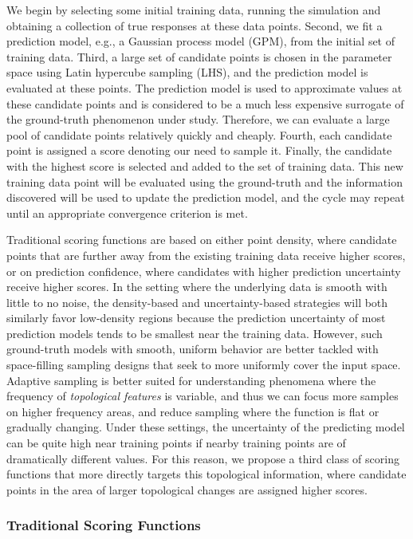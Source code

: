 We begin by selecting some initial training data, running the simulation and obtaining a collection of true responses at these data points.
%
Second, we fit a prediction model, e.g., a Gaussian process model (GPM), from the initial set of training data.
%
Third, a large set of candidate points is chosen in the parameter space using Latin hypercube sampling (LHS), and the prediction model is evaluated at these points.
%
The prediction model is used to approximate values at these candidate points and is considered to be a much less expensive surrogate of the ground-truth phenomenon under study.
%
Therefore, we can evaluate a large pool of candidate points relatively quickly and cheaply.
%
Fourth, each candidate point is assigned a score denoting our need to sample it.
%
Finally, the candidate with the highest score is selected and added to the set of training data.
%
This new training data point will be evaluated using the ground-truth and the information discovered will be used to update the prediction model, and the cycle may repeat until an appropriate convergence criterion is met.

Traditional scoring functions are based on either point density, where candidate points that are further away from the existing training data receive higher scores, or on prediction confidence, where candidates with higher prediction uncertainty receive higher scores.
%
In the setting where the underlying data is smooth with little to no noise, the density-based and uncertainty-based strategies will both similarly favor low-density regions because the prediction uncertainty of most prediction models tends to be smallest near the training data.
%
However, such ground-truth models with smooth, uniform behavior are better tackled with space-filling sampling designs that seek to more uniformly cover the input space.
%
Adaptive sampling is better suited for understanding phenomena where the frequency of \emph{topological features} is variable, and thus we can focus more samples on higher frequency areas, and reduce sampling where the function is flat or gradually changing.
%
Under these settings, the uncertainty of the predicting model can be quite high near training points if nearby training points are of dramatically different values.
%
For this reason, we propose a third class of scoring functions that more directly targets this topological
information, where candidate points in the area of larger topological changes are assigned higher scores.

\subsubsection{Traditional Scoring Functions}
\label{sec:classic}

